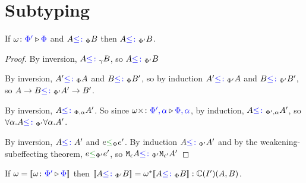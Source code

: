 \documentclass{report}
\begin{document}
\section{Subtyping}

\begin{theorem}
    If $\wrelw{\P'}{\P}$ and $A\subtypep B$ then $A\subtypepp B$.
\end{theorem}


\begin{framed}
    \begin{proof}
        \case{\sground}
            By inversion, $A\subtypeg B$, so $A\subtypepp B$
    
        \case{\sfun}
            By inversion, $A'\subtypep A$ and $B\subtypep B'$, so by induction $A'\subtypepp A$ and $B\subtypepp B'$, so $\fntype{A}{B}\subtypepp \fntype{A'}{B'}$.
    
        \case{\squant}
            By inversion, $A\subtypepa A'$. So since $\wrel{\w\x}{\P',\a}{\P,\a}$, by induction, $A\subtypeppa A'$, so $\all{\a}{A}\subtypepp \all{\a}{A'}$.   
    
        \case{\seffect}
            By inversion, $A \subtype A'$ and $e\subeffectp e'$. By induction $A\subtypepp A'$ and by the weakening-subeffecting theorem, $e\subeffectpp e'$, so $\mea\subtypepp \M{\e'}{A'}$
    \end{proof}
\end{framed}

\begin{theorem}
    If $\w = \deno{\wrelw{\P'}{\P}}$ then $\deno{A\subtypepp B} = \w\star\deno{A\subtypep B}: \C(I')(A, B)$.
\end{theorem}
\end{document}
